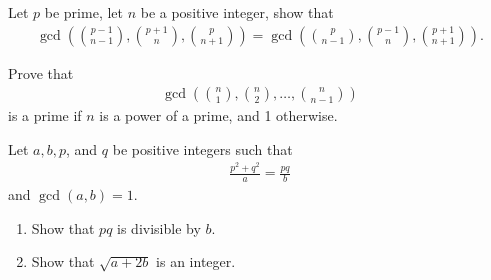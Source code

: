 \documentclass{subfile}
\begin{document}
	\begin{problem}
		Let $p$ be prime, let $n$ be a positive integer, show that
			\begin{align*}
				\gcd\left({p - 1 \choose n - 1}, {p + 1 \choose n}, {p \choose n + 1}\right) = \gcd\left({p \choose n - 1}, {p - 1 \choose n}, {p + 1 \choose n + 1}\right).
			\end{align*}
	\end{problem}




	\begin{problem}
		Prove that
			\begin{align*}
				\gcd{\left({n \choose 1},{n \choose 2},\dots,{n \choose {n - 1}}\right)}
			\end{align*}
		is a prime if $n$ is a power of a prime, and 1 otherwise. %
	\end{problem}

%

	\begin{problem}
		Let $a,b,p$, and $q$ be positive integers such that
			\begin{align*}
				\frac {p^2 + q^2}{a} = \frac {pq}{b}
			\end{align*}
		and $\gcd(a, b) = 1.$
		\begin{enumerate}
			\item  Show that $pq$ is divisible by $b$.

			\item Show that $\sqrt {a + 2b}$ is an integer.
		\end{enumerate} %
	\end{problem}
\end{document}
